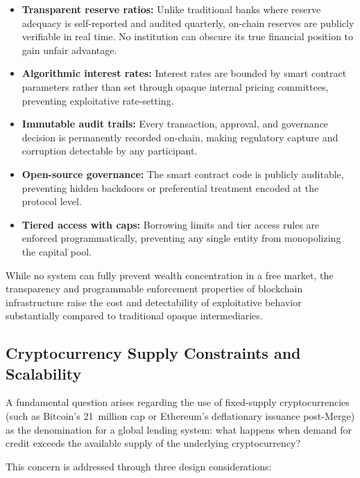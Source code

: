 \documentclass[12pt,a4paper]{report}
\begin{document}
\begin{itemize}[noitemsep]
\item \textbf{Transparent reserve ratios:} Unlike traditional banks where reserve adequacy is self-reported and audited quarterly, on-chain reserves are publicly verifiable in real time. No institution can obscure its true financial position to gain unfair advantage.
\item \textbf{Algorithmic interest rates:} Interest rates are bounded by smart contract parameters rather than set through opaque internal pricing committees, preventing exploitative rate-setting.
\item \textbf{Immutable audit trails:} Every transaction, approval, and governance decision is permanently recorded on-chain, making regulatory capture and corruption detectable by any participant.
\item \textbf{Open-source governance:} The smart contract code is publicly auditable, preventing hidden backdoors or preferential treatment encoded at the protocol level.
\item \textbf{Tiered access with caps:} Borrowing limits and tier access rules are enforced programmatically, preventing any single entity from monopolizing the capital pool.
\end{itemize}

While no system can fully prevent wealth concentration in a free market, the transparency and programmable enforcement properties of blockchain infrastructure raise the cost and detectability of exploitative behavior substantially compared to traditional opaque intermediaries.

\subsection{Cryptocurrency Supply Constraints and Scalability}

A fundamental question arises regarding the use of fixed-supply cryptocurrencies (such as Bitcoin's 21~million cap or Ethereum's deflationary issuance post-Merge) as the denomination for a global lending system: what happens when demand for credit exceeds the available supply of the underlying cryptocurrency?

This concern is addressed through three design considerations:
\end{document}
